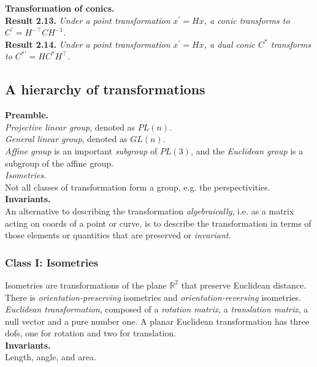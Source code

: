 \documentclass[12pt]{article}
\begin{document}
\noindent \textbf{Transformation of conics.} \\
\noindent \textbf{Result 2.13.} \textit{Under a point transformation $x^\prime = Hx$, a conic transforms to 
$C^\prime = H^{-\top} C H^{-1}$.} \\

\noindent \textbf{Result 2.14.} \textit{Under a point transformation $x^\prime = Hx$, a dual conic $C^*$ transforms
to $C^{*\prime} = HC^*H^\top$.}

\subsection{A hierarchy of transformations}
\textbf{Preamble.} \\
\textit{Projective linear group}, denoted as $PL(n)$. \\
\textit{General linear group}, denoted as $GL(n)$. \\
\textit{Affine group} is an important \textit{subgroup} of $PL(3)$, 
and the \textit{Euclidean group} is a subgroup of the affine group. \\
\textit{Isometries}. \\
Not all classes of transformation form a group, e.g. the perspectivities. \\

\noindent \textbf{Invariants.} \\
An alternative to describing the transformation \textit{algebraically}, i.e. as a matrix 
acting on coords of a point or curve, is to describe the transformation in terms of those 
elements or quantities that are preserved or \textit{invariant}. 

\subsubsection{Class \textrm{I}: Isometries}
Isometries are transformations of the plane $\mathbb{R}^2$ that preserve Euclidean distance. \\
There is \textit{orientation-preserving} isometries and \textit{orientation-reversing} isometries. \\
\textit{Euclidean transformation}, composed of a \textit{rotation matrix}, a \textit{translation matrix}, 
a null vector and a pure number one. A planar Euclidean transformation has three dofs, one for rotation and two for translation. \\

\noindent \textbf{Invariants.} \\
Length, angle, and area. \\
\end{document}
